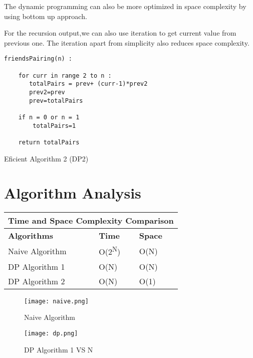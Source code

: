 \documentclass[conference]{IEEEtran}
\begin{document}
The dynamic programming can also be more optimized in space complexity by using bottom up approach.

\newline For the recursion output,we can also use iteration to get current value from previous one.
\newline The iteration apart from simplicity also reduces space complexity.

\bigskip

\begin{algorithm}[H]
\begin{lstlisting}
friendsPairing(n) :

    for curr in range 2 to n :
       totalPairs = prev+ (curr-1)*prev2
       prev2=prev
       prev=totalPairs

    if n = 0 or n = 1
        totalPairs=1

    return totalPairs

\end{lstlisting}

 \caption{Eficient Algorithm 2 (DP2)}
\end{algorithm}
\bigskip


\section{Algorithm Analysis}
\bigskip
\begin{tabular}{ |p{3cm}||p{1.5cm}|p{1.5cm}| }
 \hline
 \multicolumn{3}{|c|}{Time and Space Complexity Comparison} \\
 \hline
 \textbf{Algorithms} &  \textbf{Time}& \textbf{Space} \\
 \hline
 Naive Algorithm   & O(2\textsuperscript{N})  & O(N)\\
 \hline
 DP Algorithm 1    &   O(N)  & O(N)\\
 \hline
 DP Algorithm 2    &   O(N)  & O(1)\\
 \hline
\end{tabular}

\begin{figure}[h!]
\centerline{\texttt{[image: naive.png]}}
\caption{Naive Algorithm}
\centerline{\textit{}}
\label{fig:graph}
\end{figure}

\begin{figure}[h!]
\centerline{\texttt{[image: dp.png]}}
\caption{DP Algorithm 1 VS N}
\centerline{\textit{ }}
\label{fig:graph}
\end{figure}
\end{document}
